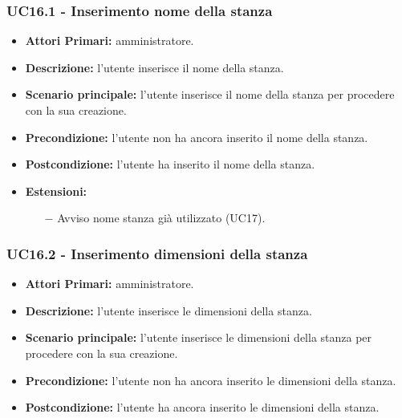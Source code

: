 \subsubsection{ UC16.1 - Inserimento nome della stanza}
\begin{itemize}
	\item\textbf{Attori Primari:}
	amministratore.
	\item\textbf{Descrizione:} 
	l'utente inserisce il nome della stanza.
	\item\textbf{Scenario principale:} 
	l'utente inserisce il nome della stanza per procedere con la sua creazione.
	\item\textbf{Precondizione:} 
	l'utente non ha ancora inserito il nome della stanza.
	\item\textbf{Postcondizione:}
	l'utente ha inserito il nome della stanza.
	\item\textbf{Estensioni:}
	\begin{itemize}
		\item[$-$] Avviso nome stanza già utilizzato (UC17).
	\end{itemize}
\end{itemize}
\subsubsection{ UC16.2 - Inserimento dimensioni della stanza}
\begin{itemize}
	\item\textbf{Attori Primari:}
	amministratore.
	\item\textbf{Descrizione:} 
	l'utente inserisce le dimensioni della stanza.
	\item\textbf{Scenario principale:} 
	l'utente inserisce le dimensioni della stanza per procedere con la sua creazione.
	\item\textbf{Precondizione:} 
	l'utente non ha ancora inserito le dimensioni della stanza.
	\item\textbf{Postcondizione:}
	l'utente ha ancora inserito le dimensioni della stanza.
\end{itemize}
